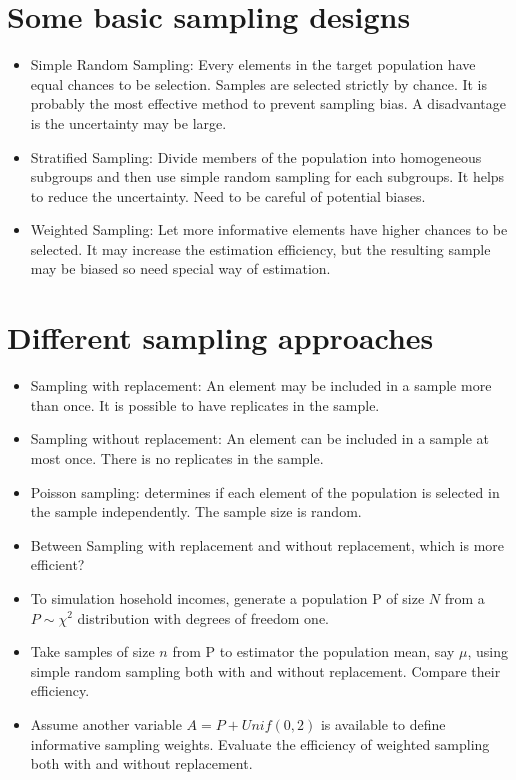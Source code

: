 \hypertarget{data}{%
  \section{Some basic sampling designs}\label{sampling-designs}}
  \begin{itemize}
  \item Simple Random Sampling: Every elements in the target population have equal chances to be selection. Samples are selected strictly by chance. It is probably the most effective method to prevent sampling bias. A disadvantage is the uncertainty may be large.
  \item Stratified Sampling: Divide members of the population into homogeneous subgroups and then use simple random sampling for each subgroups. It helps to reduce the uncertainty. Need to be careful of potential biases.
  \item Weighted Sampling: Let more informative elements have higher chances to be selected. It may increase the estimation efficiency, but the resulting sample may be biased so need special way of estimation.
  \end{itemize}
\hypertarget{data}{%
  \section{Different sampling approaches}\label{sampling-approaches}}
  \begin{itemize}
  \item Sampling with replacement: An element may be included in a sample more than once. It is possible to have replicates in the sample.
  \item Sampling without replacement: An element can be included in a sample at most once. There is no replicates in the sample.
  \item Poisson sampling: determines if each element of the population is selected in the sample independently. The sample size is random.
  \item Between Sampling with replacement and without replacement, which is more efficient?
  \end{itemize}
\begin{example}
  \begin{itemize}
  \item To simulation hosehold incomes, generate a population P of size $N$ from a $P\sim\chi^2$ distribution with degrees of freedom one.
  \item Take samples of size $n$ from P to estimator the population mean, say $\mu$, using simple random sampling both with and without replacement. Compare their efficiency.
  \item Assume another variable $A=P+Unif(0,2)$ is available to define informative sampling weights. Evaluate the efficiency of weighted sampling both with and without replacement. 
  \end{itemize}
\end{example}

